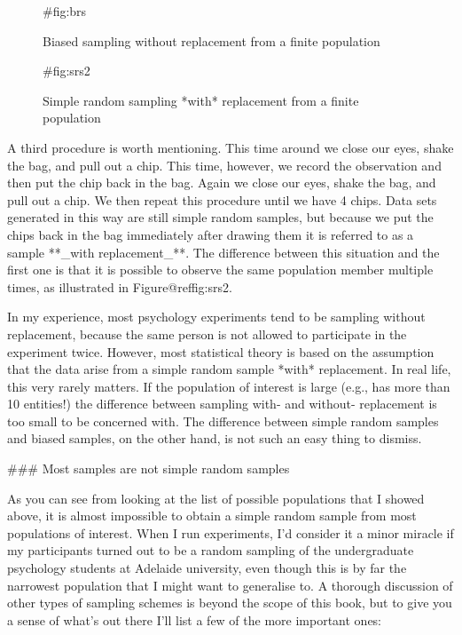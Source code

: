 \begin{figure}[t]
\begin{center}
\end{center}
\caption{Biased sampling without replacement from a finite population}
{#fig:brs}
\HR
\end{figure}

\begin{figure}[t]
\begin{center}
\end{center}
\caption{Simple random sampling *with* replacement from a finite population}
{#fig:srs2}
\HR
\end{figure}

A third procedure is worth mentioning. This time around we close our eyes, shake the bag, and pull out a chip. This time, however, we record the observation and then put the chip back in the bag. Again we close our eyes, shake the bag, and pull out a chip. We then repeat this procedure until we have 4 chips. Data sets generated in this way are still simple random samples, but because we put the chips back in the bag immediately after drawing them it is referred to as a sample **_with replacement_**. The difference between this situation and the first one is that it is possible to observe the same population member multiple times, as illustrated in Figure@reffig:srs2. 

In my experience, most psychology experiments tend to be sampling without replacement, because the same person is not allowed to participate in the experiment twice. However, most statistical theory is based on the assumption that the data arise from a simple random sample *with* replacement. In real life, this very rarely matters. If the population of interest is large (e.g., has more than 10 entities!) the difference between sampling with- and without- replacement is too small to be concerned with. The difference between simple random samples and biased samples, on the other hand, is not such an easy thing to dismiss.


### Most samples are not simple random samples

As you can see from looking at the list of possible populations that I showed above, it is almost impossible to obtain a simple random sample from most populations of interest. When I run experiments, I'd consider it a minor miracle if my participants turned out to be a random sampling of the undergraduate psychology students at Adelaide university, even though this is by far the narrowest population that I might want to generalise to. A thorough discussion of other types of sampling schemes is beyond the scope of this book, but to give you a sense of what's out there I'll list a few of the more important ones:

